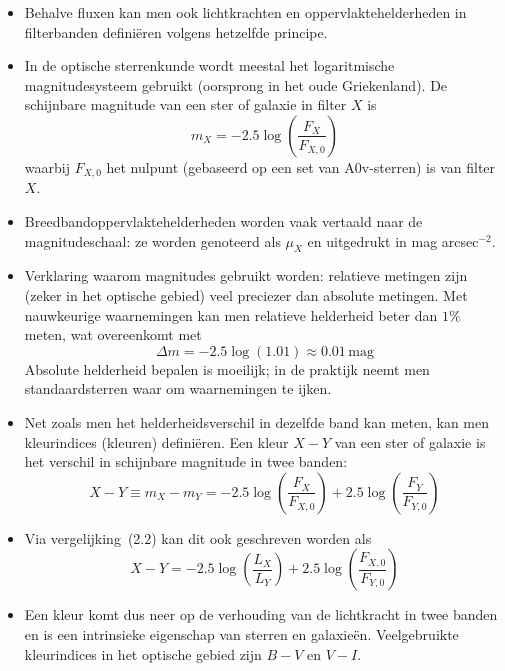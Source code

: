 \documentclass[10pt,a4paper]{article}
\renewenvironment{equation}{\begin{equation*}}{\end{equation*}}
\begin{document}
\begin{itemize}
  \item Behalve fluxen kan men ook lichtkrachten en oppervlaktehelderheden in filterbanden defini\"eren volgens hetzelfde principe.

  \item In de optische sterrenkunde wordt meestal het logaritmische magnitudesysteem gebruikt (oorsprong in het oude Griekenland). De schijnbare magnitude van een ster of galaxie in filter $X$ is
  \begin{equation}
    m_X = -2.5\log\left(\frac{F_X}{F_{X,0}}\right)
    \tag{2.8}
  \end{equation}
  waarbij $F_{X,0}$ het nulpunt (gebaseerd op een set van A0v-sterren) is van filter $X$.
  \item Breedbandoppervlaktehelderheden worden vaak vertaald naar de magnitudeschaal: ze worden genoteerd als $\mu_X$ en uitgedrukt in mag arcsec$^{-2}$.
  \item Verklaring waarom magnitudes gebruikt worden: relatieve metingen zijn (zeker in het optische gebied) veel preciezer dan absolute metingen. Met nauwkeurige waarnemingen kan men relatieve helderheid beter dan $1\%$ meten, wat overeenkomt met
  \begin{equation}
    \Delta m = -2.5\log(1.01) \approx 0.01\,\mathrm{mag}
    \tag{2.9}
  \end{equation}
  Absolute helderheid bepalen is moeilijk; in de praktijk neemt men standaardsterren waar om waarnemingen te ijken.

  \item Net zoals men het helderheidsverschil in dezelfde band kan meten, kan men kleurindices (kleuren) defini\"eren. Een kleur $X-Y$ van een ster of galaxie is het verschil in schijnbare magnitude in twee banden:
  \begin{equation}
    X-Y \equiv m_X - m_Y
    = -2.5\log\left(\frac{F_X}{F_{X,0}}\right)
      + 2.5\log\left(\frac{F_Y}{F_{Y,0}}\right)
    \tag{2.10}
  \end{equation}
  \item Via vergelijking~(2.2) kan dit ook geschreven worden als
  \begin{equation}
    X-Y = -2.5\log\left(\frac{L_X}{L_Y}\right)
          + 2.5\log\left(\frac{F_{X,0}}{F_{Y,0}}\right)
    \tag{2.11}
  \end{equation}
  \item Een kleur komt dus neer op de verhouding van de lichtkracht in twee banden en is een intrinsieke eigenschap van sterren en galaxie\"en. Veelgebruikte kleurindices in het optische gebied zijn $B-V$ en $V-I$.
\end{itemize}
\end{document}

